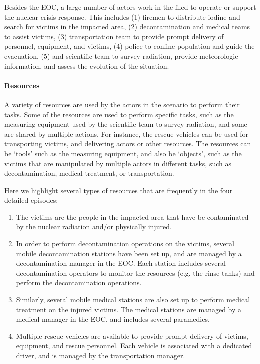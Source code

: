 Besides the EOC, a large number of actors work in the filed to operate or support the nuclear crisis response. This includes (1) firemen to distribute iodine and search for victims in the impacted area, (2) decontamination and medical teams to assist victims, (3) transportation team to provide prompt delivery of personnel, equipment, and victims, (4) police to confine population and guide the evacuation, (5) and scientific team to survey radiation, provide meteorologic information, and assess the evolution of the situation.

\paragraph*{Resources} %
\label{par:resources}
A variety of resources are used by the actors in the scenario to perform their tasks. Some of the resources are used to perform specific tasks, such as the measuring equipment used by the scientific team to survey radiation, and some are shared by multiple actions. For instance, the rescue vehicles can be used for transporting victims, and delivering actors or other resources. The resources can be `tools' such as the measuring equipment, and also be `objects', such as the victims that are manipulated by multiple actors in different tasks, such as decontamination, medical treatment, or transportation. 

Here we highlight several types of resources that are frequently in the four detailed episodes:

\begin{enumerate}
	\item The victims are the people in the impacted area that have be contaminated by the nuclear radiation and/or physically injured.
	\item In order to perform decontamination operations on the victims, several mobile decontamination stations have been set up, and are managed by a decontamination manager in the EOC. Each station includes several decontamination operators to monitor the resources (e.g. the rinse tanks) and perform the decontamination operations.
	\item Similarly, several mobile medical stations are also set up to perform medical treatment on the injured victims. The medical stations are managed by a medical manager in the EOC, and includes several paramedics.
	\item Multiple rescue vehicles are available to provide prompt delivery of victims, equipment, and rescue personnel. Each vehicle is associated with a dedicated driver, and is managed by the transportation manager.
\end{enumerate}

